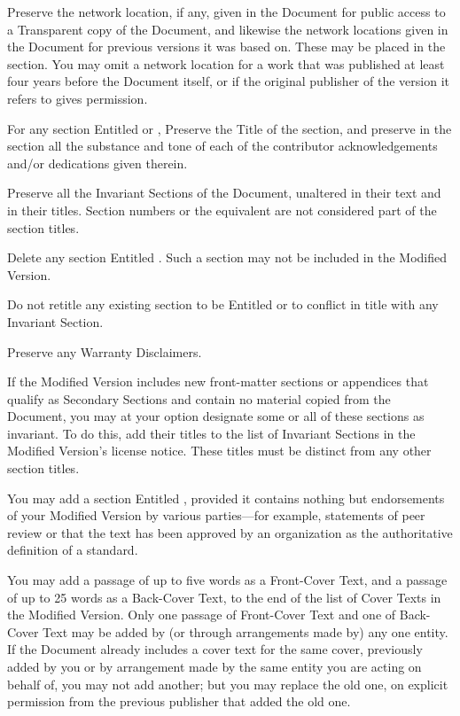 \item[J.]
   Preserve the network location, if any, given in the Document for
   public access to a Transparent copy of the Document, and likewise
   the network locations given in the Document for previous versions
   it was based on.  These may be placed in the  section.
   You may omit a network location for a work that was published at
   least four years before the Document itself, or if the original
   publisher of the version it refers to gives permission.

\item[K.]
   For any section Entitled  or ,
   Preserve the Title of the section, and preserve in the section all
   the substance and tone of each of the contributor acknowledgements
   and/or dedications given therein.

\item[L.]
   Preserve all the Invariant Sections of the Document,
   unaltered in their text and in their titles.  Section numbers
   or the equivalent are not considered part of the section titles.

\item[M.]
   Delete any section Entitled .  Such a section
   may not be included in the Modified Version.

\item[N.]
   Do not retitle any existing section to be Entitled 
   or to conflict in title with any Invariant Section.

\item[O.]
   Preserve any Warranty Disclaimers.
\stopitemize

If the Modified Version includes new front-matter sections or
appendices that qualify as Secondary Sections and contain no material
copied from the Document, you may at your option designate some or all
of these sections as invariant.  To do this, add their titles to the
list of Invariant Sections in the Modified Version's license notice.
These titles must be distinct from any other section titles.

You may add a section Entitled , provided it contains
nothing but endorsements of your Modified Version by various
parties---for example, statements of peer review or that the text has
been approved by an organization as the authoritative definition of a
standard.

You may add a passage of up to five words as a Front-Cover Text, and a
passage of up to 25 words as a Back-Cover Text, to the end of the list
of Cover Texts in the Modified Version.  Only one passage of
Front-Cover Text and one of Back-Cover Text may be added by (or
through arrangements made by) any one entity.  If the Document already
includes a cover text for the same cover, previously added by you or
by arrangement made by the same entity you are acting on behalf of,
you may not add another; but you may replace the old one, on explicit
permission from the previous publisher that added the old one.

